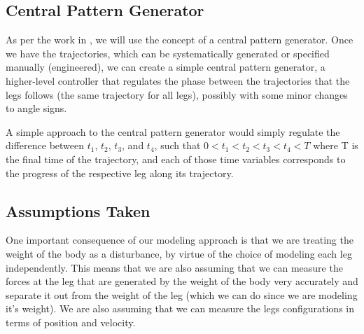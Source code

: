 \subsection{Central Pattern Generator}
As per the work in \cite{kimura2007adaptive}, we will use the concept of a central pattern generator. Once we have the trajectories, which can be systematically generated or specified manually (engineered), we can create a simple central pattern generator, a higher-level controller that regulates the phase between the trajectories that the legs follows (the same trajectory for all legs), possibly with some minor changes to angle signs.

A simple approach to the central pattern generator would simply regulate the difference between $t_1$, $t_2$, $t_3$, and $t_4$, such that $0 < t_1 < t_2 < t_3 < t_4 < T$ where T is the final time of the trajectory, and each of those time variables corresponds to the progress of the respective leg along its trajectory.

\subsection{Assumptions Taken}
One important consequence of our modeling approach is that we are treating the weight of the body as a disturbance, by virtue of the choice of modeling each leg independently. This means that we are also assuming that we can measure the forces at the leg that are generated by the weight of the body very accurately and separate it out from the weight of the leg (which we can do since we are modeling it's weight).
We are also assuming that we can measure the legs configurations in terms of position and velocity.


